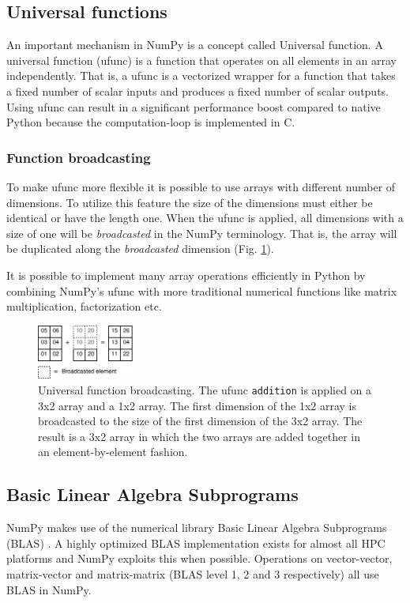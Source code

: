 \documentclass{sigplanconf}
\begin{document}
\subsection{Universal functions}
An important mechanism in NumPy is a concept called Universal function. A universal function (ufunc) is a function that operates on all elements in an array independently. That is, a ufunc is a vectorized wrapper for a function that takes a fixed number of scalar inputs and produces a fixed number of scalar outputs. Using ufunc can result in a significant performance boost compared to native Python because the computation-loop is implemented in C.

\subsubsection{Function broadcasting}
To make ufunc more flexible it is possible to use arrays with different number of dimensions. To utilize this feature the size of the dimensions must either be identical or have the length one. When the ufunc is applied, all dimensions with a size of one will be \emph{broadcasted} in the NumPy terminology. That is, the array will be duplicated along the \emph{broadcasted} dimension (Fig. \ref{fig:ufunc_broadcast}).

It is possible to implement many array operations efficiently in Python by combining NumPy's ufunc with more traditional numerical functions like matrix multiplication, factorization etc.

\begin{figure}
 \centering
 \includegraphics[width=120px]{gfx/ufunc_broadcast}
 \caption{Universal function broadcasting. The ufunc \texttt{addition} is applied on a 3x2 array and a 1x2 array. The first dimension of the 1x2 array is broadcasted to the size of the first dimension of the 3x2 array. The result is a 3x2 array in which the two arrays are added together in an element-by-element fashion.}
 \label{fig:ufunc_broadcast}
\end{figure}


\subsection{Basic Linear Algebra Subprograms}
NumPy makes use of the numerical library Basic Linear Algebra Subprograms (BLAS) \cite{blas79}. A highly optimized BLAS implementation exists for almost all HPC platforms and NumPy exploits this when possible. Operations on vector-vector, matrix-vector and matrix-matrix (BLAS level 1, 2 and 3 respectively) all use BLAS in NumPy. 
\end{document}

